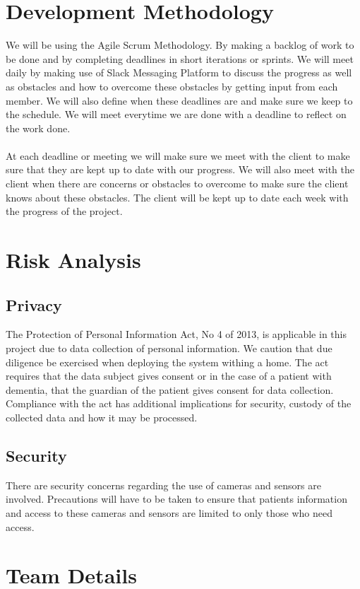 \documentclass{article}
\begin{document}
\section{Development Methodology}
We will be using the Agile Scrum Methodology. By making a backlog of work to be done and by completing deadlines in short iterations or sprints. We will meet daily by making use of  Slack Messaging Platform to discuss the progress as well as obstacles and how to overcome these obstacles by getting input from each member. We will also define when these deadlines are and make sure we keep to the schedule. We will meet everytime we are done with a deadline to reflect on the work done. \\ \\
At each deadline or meeting we will make sure we meet with the client to make sure that they are kept up to date with our progress. We will also meet with the client when there are concerns or obstacles to overcome to make sure the client knows  about these obstacles. The client will be kept up to date each week with the progress of the project.

\section{Risk Analysis}
\subsection{Privacy}
The Protection of Personal Information Act, No 4 of 2013, is applicable in this project due to data collection of personal information. We caution that due diligence be exercised when deploying the system withing a home. The act requires that the data subject gives consent or in the case of a patient with dementia, that the guardian of the patient gives consent for data collection. Compliance with the act has additional implications for security, custody of the collected data and how it may be processed.

\subsection{Security}
There are security concerns regarding the use of cameras and sensors are involved. Precautions will have to be taken to ensure that patients information and access to these cameras and sensors are limited to only those who need access.


\newpage
\section{Team Details}
\end{document}
